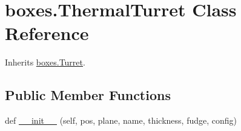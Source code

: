 \hypertarget{classboxes_1_1_thermal_turret}{}\section{boxes.\+Thermal\+Turret Class Reference}
\label{classboxes_1_1_thermal_turret}


Inherits \hyperlink{classboxes_1_1_turret}{boxes.\+Turret}.

\subsection*{Public Member Functions}
\begin{DoxyCompactItemize}
\item 
def \hyperlink{classboxes_1_1_thermal_turret_a0406fe96dfb6c002179213807f4c04ac}{\+\_\+\+\_\+init\+\_\+\+\_\+} (self, pos, plane, name, thickness, fudge, config)
\end{DoxyCompactItemize}

